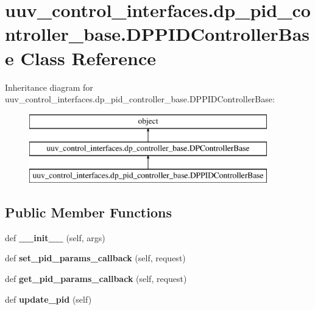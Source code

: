 \hypertarget{classuuv__control__interfaces_1_1dp__pid__controller__base_1_1DPPIDControllerBase}{}\section{uuv\+\_\+control\+\_\+interfaces.\+dp\+\_\+pid\+\_\+controller\+\_\+base.\+D\+P\+P\+I\+D\+Controller\+Base Class Reference}
\label{classuuv__control__interfaces_1_1dp__pid__controller__base_1_1DPPIDControllerBase}
Inheritance diagram for uuv\+\_\+control\+\_\+interfaces.\+dp\+\_\+pid\+\_\+controller\+\_\+base.\+D\+P\+P\+I\+D\+Controller\+Base\+:\begin{figure}[H]
\begin{center}
\leavevmode
\includegraphics[height=3.000000cm]{classuuv__control__interfaces_1_1dp__pid__controller__base_1_1DPPIDControllerBase}
\end{center}
\end{figure}
\subsection*{Public Member Functions}
\begin{DoxyCompactItemize}
\item 
\mbox{\label{classuuv__control__interfaces_1_1dp__pid__controller__base_1_1DPPIDControllerBase_afc878f6e0da80cb40441239ddd0a302d}} 
def {\bfseries \+\_\+\+\_\+init\+\_\+\+\_\+} (self, args)
\item 
\mbox{\label{classuuv__control__interfaces_1_1dp__pid__controller__base_1_1DPPIDControllerBase_aed2f924fb542ff14d9089f94e971bc57}} 
def {\bfseries set\+\_\+pid\+\_\+params\+\_\+callback} (self, request)
\item 
\mbox{\label{classuuv__control__interfaces_1_1dp__pid__controller__base_1_1DPPIDControllerBase_a0b48103803a42818aebe9ca7177fa4d5}} 
def {\bfseries get\+\_\+pid\+\_\+params\+\_\+callback} (self, request)
\item 
\mbox{\label{classuuv__control__interfaces_1_1dp__pid__controller__base_1_1DPPIDControllerBase_aa2c44fa417cc560730ca270998a5c85b}} 
def {\bfseries update\+\_\+pid} (self)
\end{DoxyCompactItemize}
